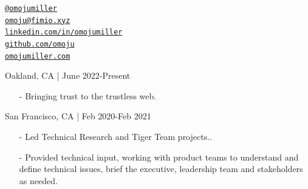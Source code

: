 \documentclass[11pt,article,oneside]{memoir}
\makeatletter
\def\myemail{omoju@fimio.xyz}
\def\myweb{omojumiller.com}
\def\mytwitter{@omojumiller}
\def\mylinkedin{linkedin.com/in/omojumiller}
\def\mygithub{github.com/omoju}
\makeatother
\begin{document}
\begin{minipage}[t]{2.95in}

\end{minipage}
\hfill
\hfill
\begin{minipage}[t]{2in}
  \flushright \footnotesize  \addressblock
  {\scriptsize  \texttt{\href{http://twitter.com/omojumiller}{\mytwitter}} \, \faTwitter }  \\
  {\scriptsize  \texttt{\href{mailto:\myemail}{\myemail}} \, \faEnvelope} \\
  {\scriptsize  \texttt{\href{\mylinkedin}{\mylinkedin}} \, \faLinkedin} \\
  {\scriptsize  \texttt{\href{\mygithub}{\mygithub}} \, \faGithub} \\
  {\scriptsize  \texttt{\href{\myweb}{\myweb}} \, \faGlobe}
\end{minipage}

\medskip


\bigskip       
{}
\reversemarginpar



\medskip

 \hfill Oakland, CA | June 2022-Present
\begin{itemize}[nolistsep]
\item[-] Bringing trust to the trustless web.
\end{itemize} 

 \hfill San Francisco, CA | Feb 2020-Feb 2021
\begin{itemize}[nolistsep]
\item[-]Led Technical Research and Tiger Team projects..
\item[-]Provided technical input, working with product teams to understand and define technical
issues, brief the executive, leadership team and stakeholders as needed.
\end{itemize} 
\end{document}
